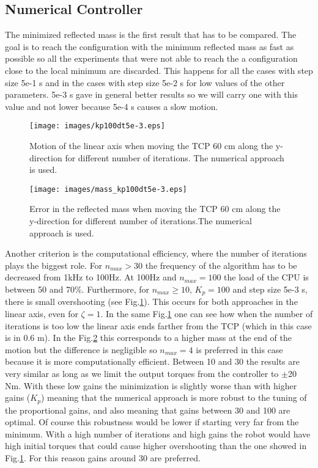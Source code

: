 \subsection{Numerical Controller}




The minimized reflected mass is the first result that has to be compared. The goal is to reach the configuration with the minimum reflected mass as fast as possible so all the experiments that were not able to reach the a configuration close to the local minimum are discarded. This happens for all the cases with step size 5e-1 s and in the cases with step size  5e-2 s for low values of the other parameters. 5e-3 s gave in general better results so we will carry one with this value and not lower because 5e-4 s causes a  slow motion.
\begin{figure}[!htb]
	\centerline{
		\texttt{[image: images/kp100dt5e-3.eps]}}
	\caption{Motion of the linear axis when moving the TCP 60 cm along the y-direction for different number of iterations. The numerical approach is used.}
	\label{fig:kp100dt5e-3}
\end{figure}

\begin{figure}[!htb]
	\centerline{
		\texttt{[image: images/mass\_kp100dt5e-3.eps]}}
	\caption{Error in the reflected mass when moving the TCP 60 cm along the y-direction for different number of iterations.The numerical approach is used.}
	\label{fig:mass_kp100dt5e-3}
\end{figure}

Another criterion is the computational efficiency, where the number of iterations plays the biggest role. For $n_{max} > 30$ the frequency of the algorithm has to be decreased from 1kHz to 100Hz. At 100Hz and $n_{max} = 100$ the load of the CPU is between 50 and 70\%. Furthermore, for  $n_{max} \ge 10$,  $K_p=100$ and step size 5e-3 s,  there is small overshooting (see Fig.\ref{fig:kp100dt5e-3}). This occurs for both approaches in the linear axis, even for $\zeta = 1$. In the same Fig.\ref{fig:kp100dt5e-3} one can see how when the number of iterations is too low the linear axis ends farther from the TCP (which in this case is in 0.6 m). In the Fig.\ref{fig:mass_kp100dt5e-3} this corresponds to a higher mass at the end of the motion but the difference is negligible so $n_{max} = 4$ is preferred in this case because it is more computationally efficient. 
Between 10 and 30 the results are very similar as long as we limit the output torques from the controller to $\pm$20 Nm. With these low gains the minimization is slightly worse than with higher gains ($K_p$) meaning that the numerical approach is more robust to the tuning of the proportional gains, and also meaning that gains between 30 and 100 are optimal.
Of course this robustness would be lower if starting very far from the minimum. With a high number of iterations and high gains the robot would have high initial torques that could cause higher overshooting than the one showed in Fig.\ref{fig:kp100dt5e-3}. For this reason gains around 30 are preferred. 

